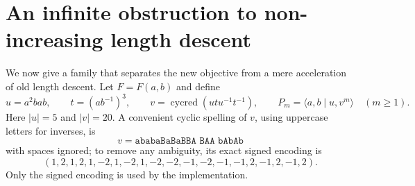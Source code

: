 \documentclass[11pt,letterpaper]{article}
\theoremstyle{definition}\newtheorem{definition}[theorem]{Definition}
\newcommand{\cyc}{\operatorname{cycred}}
\begin{document}
\section{An infinite obstruction to non-increasing length descent}\label{sec:barrier}
We now give a family that separates the new objective from a mere acceleration of old length descent. Let $F=F(a,b)$ and define
\begin{equation}\label{eq:family}
 u=a^2bab,\qquad t=(ab^{-1})^3,\qquad
 v=\cyc(utu^{-1}t^{-1}),\qquad
 P_m=\langle a,b\mid u,v^m\rangle \quad(m\ge1).
\end{equation}
Here $|u|=5$ and $|v|=20$. A convenient cyclic spelling of $v$, using uppercase letters for inverses, is
\[
 v=\texttt{ababaBaBaBBA BAA bAbAb}
\]
with spaces ignored; to remove any ambiguity, its exact signed encoding is
\begin{equation}\label{eq:vlist}
 (1,2,1,2,1,-2,1,-2,1,-2,-2,-1,-2,-1,-1,2,-1,2,-1,2).
\end{equation}
Only the signed encoding is used by the implementation.
\end{document}
